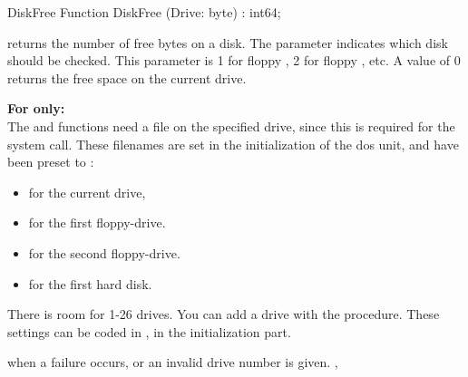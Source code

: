 \begin{function}{DiskFree}
\Declaration
Function DiskFree (Drive: byte) : int64;
\Description

 returns the number of free bytes on a disk. The parameter
 indicates which disk should be checked. This parameter is 1 for
floppy , 2 for floppy , etc. A value of 0 returns the free
space on the current drive. 

\textbf{For \unix only:}\\
The  and  functions need a file on the 
specified drive, since this is required for the  system call.
These filenames are set in the initialization of the dos unit, and have 
been preset to :
\begin{itemize}
\item {} for the current drive, 
\item {} for the first floppy-drive.
\item {} for the second floppy-drive.
\item {} for the first hard disk.
\end{itemize}
There is room for 1-26 drives. You can add a drive with the
 procedure.
These settings can be coded in , in the initialization part.

 when a failure occurs, or an invalid drive number is given.
\SeeAlso
{}, 
\end{function}


